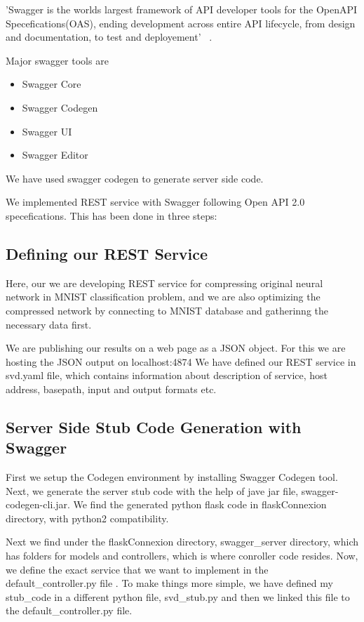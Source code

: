 'Swagger is the worlds largest framework of API developer tools for the OpenAPI
 Specefications(OAS), ending development across entire API lifecycle, from
 design and documentation, to test and deployement'
 ~\cite{hid-sp18-401-Swagger-Service}.

 Major swagger tools are 

\begin{itemize}

  \item Swagger Core
  \item Swagger Codegen
  \item Swagger UI
  \item Swagger Editor

\end{itemize}

We have used swagger codegen to generate server side code. 

We implemented REST service with Swagger following Open API 2.0 
specefications. This has been done in three steps:

\subsection{Defining our REST Service}

Here, our we are developing REST service for compressing original neural network
in MNIST classification problem, and we are also optimizing the compressed
network by connecting to MNIST database and gatherinng the necessary data first.

We are publishing our results on a web page as a JSON object. For this we are
hosting the JSON output on localhost:4874 We have defined our REST service in
svd.yaml file, which contains information about description of service, host
address, basepath, input and output formats etc.

\subsection{Server Side Stub Code Generation with Swagger} 

First we setup the Codegen environment by installing Swagger Codegen tool. Next,
we generate the server stub code with the help of jave jar file, swagger-
codegen-cli.jar. We find the generated python flask code in flaskConnexion
directory, with python2 compatibility.

Next we find under the flaskConnexion directory, swagger\_server directory, which
has folders for models and controllers, which is where conroller code resides.
Now, we define the exact service that we want to implement in the
default\_controller.py file . To make things more simple, we have defined my
stub\_code in a different python file, svd\_stub.py and then we linked this file
to the default\_controller.py file.

